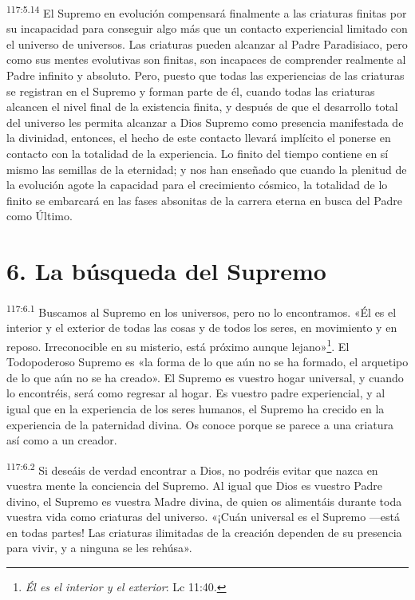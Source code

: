 \par
\textsuperscript{117:5.14} El Supremo en evolución compensará finalmente a las criaturas finitas por su incapacidad para conseguir algo más que un contacto experiencial limitado con el universo de universos. Las criaturas pueden alcanzar al Padre Paradisiaco, pero como sus mentes evolutivas son finitas, son incapaces de comprender realmente al Padre infinito y absoluto. Pero, puesto que todas las experiencias de las criaturas se registran en el Supremo y forman parte de él, cuando todas las criaturas alcancen el nivel final de la existencia finita, y después de que el desarrollo total del universo les permita alcanzar a Dios Supremo como presencia manifestada de la divinidad, entonces, el hecho de este contacto llevará implícito el ponerse en contacto con la totalidad de la experiencia. Lo finito del tiempo contiene en sí mismo las semillas de la eternidad; y nos han enseñado que cuando la plenitud de la evolución agote la capacidad para el crecimiento cósmico, la totalidad de lo finito se embarcará en las fases absonitas de la carrera eterna en busca del Padre como Último.

\section*{6. La búsqueda del Supremo}
\par
\textsuperscript{117:6.1} Buscamos al Supremo en los universos, pero no lo encontramos. «Él es el interior y el exterior de todas las cosas y de todos los seres, en movimiento y en reposo. Irreconocible en su misterio, está próximo aunque lejano»\footnote{\textit{Él es el interior y el exterior}: Lc 11:40.}. El Todopoderoso Supremo es «la forma de lo que aún no se ha formado, el arquetipo de lo que aún no se ha creado». El Supremo es vuestro hogar universal, y cuando lo encontréis, será como regresar al hogar. Es vuestro padre experiencial, y al igual que en la experiencia de los seres humanos, el Supremo ha crecido en la experiencia de la paternidad divina. Os conoce porque se parece a una criatura así como a un creador.

\par
\textsuperscript{117:6.2} Si deseáis de verdad encontrar a Dios, no podréis evitar que nazca en vuestra mente la conciencia del Supremo. Al igual que Dios es vuestro Padre divino, el Supremo es vuestra Madre divina, de quien os alimentáis durante toda vuestra vida como criaturas del universo. «¡Cuán universal es el Supremo ---está en todas partes! Las criaturas ilimitadas de la creación dependen de su presencia para vivir, y a ninguna se les rehúsa».

